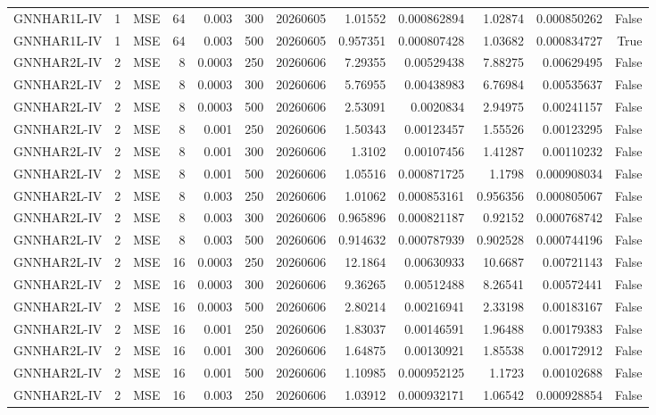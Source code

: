 \begin{tabular}{lrlrrrrrrrrr}
GNNHAR1L-IV & 1 & MSE & 64 & 0.003 & 300 & 20260605 & 1.01552 & 0.000862894 & 1.02874 & 0.000850262 & False \\
GNNHAR1L-IV & 1 & MSE & 64 & 0.003 & 500 & 20260605 & 0.957351 & 0.000807428 & 1.03682 & 0.000834727 & True \\
GNNHAR2L-IV & 2 & MSE & 8 & 0.0003 & 250 & 20260606 & 7.29355 & 0.00529438 & 7.88275 & 0.00629495 & False \\
GNNHAR2L-IV & 2 & MSE & 8 & 0.0003 & 300 & 20260606 & 5.76955 & 0.00438983 & 6.76984 & 0.00535637 & False \\
GNNHAR2L-IV & 2 & MSE & 8 & 0.0003 & 500 & 20260606 & 2.53091 & 0.0020834 & 2.94975 & 0.00241157 & False \\
GNNHAR2L-IV & 2 & MSE & 8 & 0.001 & 250 & 20260606 & 1.50343 & 0.00123457 & 1.55526 & 0.00123295 & False \\
GNNHAR2L-IV & 2 & MSE & 8 & 0.001 & 300 & 20260606 & 1.3102 & 0.00107456 & 1.41287 & 0.00110232 & False \\
GNNHAR2L-IV & 2 & MSE & 8 & 0.001 & 500 & 20260606 & 1.05516 & 0.000871725 & 1.1798 & 0.000908034 & False \\
GNNHAR2L-IV & 2 & MSE & 8 & 0.003 & 250 & 20260606 & 1.01062 & 0.000853161 & 0.956356 & 0.000805067 & False \\
GNNHAR2L-IV & 2 & MSE & 8 & 0.003 & 300 & 20260606 & 0.965896 & 0.000821187 & 0.92152 & 0.000768742 & False \\
GNNHAR2L-IV & 2 & MSE & 8 & 0.003 & 500 & 20260606 & 0.914632 & 0.000787939 & 0.902528 & 0.000744196 & False \\
GNNHAR2L-IV & 2 & MSE & 16 & 0.0003 & 250 & 20260606 & 12.1864 & 0.00630933 & 10.6687 & 0.00721143 & False \\
GNNHAR2L-IV & 2 & MSE & 16 & 0.0003 & 300 & 20260606 & 9.36265 & 0.00512488 & 8.26541 & 0.00572441 & False \\
GNNHAR2L-IV & 2 & MSE & 16 & 0.0003 & 500 & 20260606 & 2.80214 & 0.00216941 & 2.33198 & 0.00183167 & False \\
GNNHAR2L-IV & 2 & MSE & 16 & 0.001 & 250 & 20260606 & 1.83037 & 0.00146591 & 1.96488 & 0.00179383 & False \\
GNNHAR2L-IV & 2 & MSE & 16 & 0.001 & 300 & 20260606 & 1.64875 & 0.00130921 & 1.85538 & 0.00172912 & False \\
GNNHAR2L-IV & 2 & MSE & 16 & 0.001 & 500 & 20260606 & 1.10985 & 0.000952125 & 1.1723 & 0.00102688 & False \\
GNNHAR2L-IV & 2 & MSE & 16 & 0.003 & 250 & 20260606 & 1.03912 & 0.000932171 & 1.06542 & 0.000928854 & False \\

\end{tabular}
